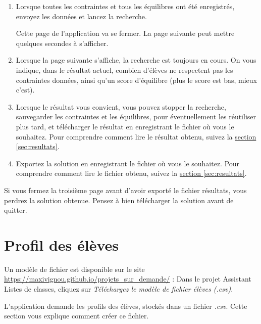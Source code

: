 \documentclass[11pt,a4paper]{article}
\newcommand{\nomproduit}{Assistant Listes de classes}
\begin{document}
\begin{enumerate}
\begin{itemize}
    \begin{enumerate}
      \item Sélectionnez les options concernées.
      \item Sélectionnez les classes concernées.
      \item Validez l'équilibre.
    \end{enumerate}
  \end{itemize}
  \item Lorsque toutes les contraintes et tous les équilibres ont été enregistrés, envoyez les données et lancez la recherche. \begin{note}Cette page de l'application va se fermer. La page suivante peut mettre quelques secondes à s'afficher.\end{note}
  \item Lorsque la page suivante s'affiche, la recherche est toujours en cours. On vous indique, dans le résultat actuel, combien d'élèves ne respectent pas les contraintes données, ainsi qu'un score d'équilibre (plus le score est bas, mieux c'est).
  \item Lorsque le résultat vous convient, vous pouvez stopper la recherche, sauvegarder les contraintes et les équilibres, pour éventuellement les réutiliser plus tard, et télécharger le résultat en enregistrant le fichier où vous le souhaitez. Pour comprendre comment lire le résultat obtenu, suivez la \hyperref[sec:resultats]{section \ref{sec:resultats}}.
  \item Exportez la solution en enregistrant le fichier où vous le souhaitez. Pour comprendre comment lire le fichier obtenu, suivez la \hyperref[sec:resultats]{section \ref{sec:resultats}}.
\end{enumerate}

\begin{danger}
Si vous fermez la troisième page avant d'avoir exporté le fichier résultats, vous perdrez la solution obtenue. Pensez à bien télécharger la solution avant de quitter.
\end{danger}

\section{Profil des élèves}
\label{sec:eleves}
\begin{note}
Un modèle de fichier est disponible sur le site \url{https://maxivignou.github.io/projets_sur_demande/} : Dans le projet \nomproduit{}, cliquez sur \textit{Téléchargez le modèle de fichier élèves (.csv)}.
\end{note}
L'application demande les profils des élèves, stockés dans un fichier \textit{.csv}. Cette section vous explique comment créer ce fichier.
\end{document}
